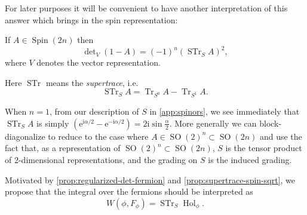 \documentclass[12pt,letterpaper,reqno]{article}
\numberwithin{equation}{section}
\newcommand{\fso}{{\mathfrak {so}}}
\newcommand{\R}{\ensuremath{\mathbb R}}
\newcommand{\half}{\ensuremath{\frac{1}{2}}}
\newcommand{\I}{{\mathrm i}}
\newcommand{\e}{{\mathrm e}}
\newcommand{\ti}[1]{\textit{#1}}
\DeclareMathOperator{\Tr}{Tr}
\DeclareMathOperator{\STr}{STr}
\DeclareMathOperator{\Hol}{Hol}
\DeclareMathOperator{\Spin}{Spin}
\DeclareMathOperator{\SO}{SO}
\newcommand{\fixme}[1]{{\color{orange}{[#1]}}}
\begin{document}
For later purposes it will be convenient to have another interpretation
of this answer which brings in the spin representation:
\begin{prop} \label{prop:supertrace-spin-sqrt}
If $A \in \Spin(2n)$ then 
\begin{equation} \label{eq:str-sqrt}
\det\nolimits_V (1 - A) = (-1)^n (\STr_S A)^2,
\end{equation}
where $V$ denotes
the vector representation.
\end{prop}
Here $\STr$ means the \ti{supertrace}, i.e.
\begin{equation}
  \STr_S A = \Tr_{S^0} A - \Tr_{S^1} A.
\end{equation}

\begin{pf}
When $n = 1$, from our description of $S$ in \autoref{app:spinors}, we
see immediately that $\STr_S A$ is simply $(\e^{\I \alpha / 2} - \e^{-\I \alpha / 2}) = 2 \I \sin \frac{\alpha}{2}$.
More generally we can block-diagonalize to reduce to the 
case where $A \in \SO(2)^n \subset \SO(2n)$
and use the fact that, as a representation of $\SO(2)^n \subset \SO(2n)$,
$S$ is the tensor product of $2$-dimensional representations,
and the grading on $S$ is the induced grading.
\end{pf}

Motivated by \autoref{prop:regularized-det-fermion} and \autoref{prop:supertrace-spin-sqrt},
we propose that the integral over the fermions should be interpreted as
\fixme{watch the $(-1)^n$}
\begin{equation}
  W(\phi, F_\phi) = \STr_S \Hol_\phi.
\end{equation}


\end{document}
